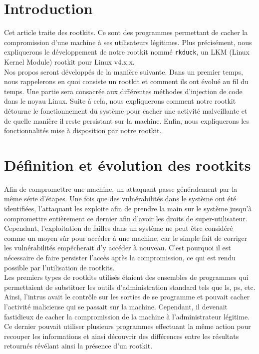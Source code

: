 \documentclass[11pt]{article}
\begin{document}
\newpage


\section{Introduction}

	Cet article traite des rootkits. Ce sont des programmes permettant de cacher la compromission d'une machine à ses utilisateurs légitimes. Plus précisément, nous expliquerons le développement de notre rootkit nommé \texttt{rkduck}, un LKM (Linux Kernel Module) rootkit pour Linux v4.x.x. \\

	Nos propos seront développés de la manière suivante. Dans un premier temps, nous rappelerons en quoi consiste un rootkit et comment ils ont évolué au fil du temps. Une partie sera consacrée aux différentes méthodes d'injection de code dans le noyau Linux. Suite à cela, nous expliquerons comment notre rootkit détourne le fonctionnement du système pour cacher une activité malveillante et de quelle manière il reste persistant sur la machine. Enfin, nous expliquerons les fonctionnalités mise à disposition par notre rootkit.

\section{Définition et évolution des rootkits}

	Afin de compromettre une machine, un attaquant passe généralement par la même série d'étapes. Une fois que des vulnérabilités dans le système ont été identifiées, l'attaquant les exploite afin de prendre la main sur le système jusqu'à compromettre entièrement ce dernier afin d'avoir les droits de super-utilisateur.
	Cependant, l'exploitation de failles dans un système ne peut être considéré comme un moyen sûr pour accéder à une machine, car le simple fait de corriger les vulnérabilités empêcherait d'y accéder à nouveau. C'est pourquoi il est nécessaire de faire persister l'accès après la compromission, ce qui est rendu possible par l'utilisation de rootkits.\\
	
	Les premiers types de rootkits utilisés étaient des ensembles de programmes qui permettaient de substituer les outils d'administration standard tels que ls, ps, etc. Ainsi, l'intrus avait le contrôle sur les sorties de se programme et pouvait cacher l'activité malicieuse qui se passait sur la machine. Cependant, il devenait fastidieux de cacher la compromission de la machine à l'administrateur légitime. Ce dernier pouvait utiliser plusieurs programmes effectuant la même action pour recouper les informations et ainsi découvrir des différences entre les résultats retournés révélant ainsi la présence d'un rootkit.\\
	
\end{document}
